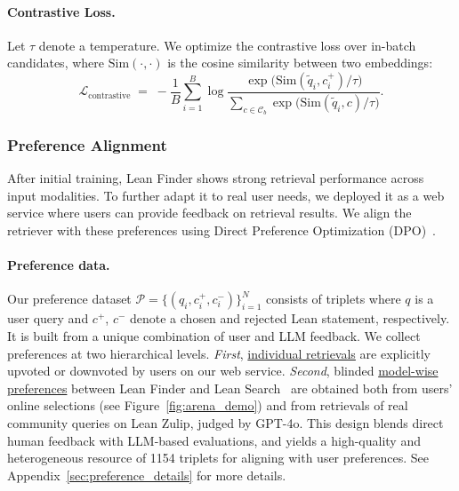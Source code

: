 \documentclass{article} %
\begin{document}
\paragraph{Contrastive Loss.}
Let \(\tau\) denote a temperature. We optimize the contrastive loss over in-batch candidates, 
where \(\mathrm{Sim}(\cdot,\cdot)\) is the cosine similarity between two embeddings:
{\small
\[
\mathcal{L_{\mathrm{contrastive}}}
\;=\;
-\frac{1}{B}\sum_{i=1}^{B}
\log
\frac{\exp\!\big(\mathrm{Sim}(\tilde q_i, c_i^{+})/\tau\big)}
{\displaystyle \sum_{c \in \mathcal{C}_b} \exp\!\big(\mathrm{Sim}(\tilde q_i, c)/\tau\big)}.
\]
}
\subsubsection{Preference Alignment}
\label{sec:rlhf}
After initial training, Lean Finder shows strong retrieval performance across input modalities. To further adapt it to real user needs, we deployed it as a web service where users can provide feedback on retrieval results. We align the retriever with these preferences using Direct Preference Optimization (DPO)~\citep{rafailov2024directpreferenceoptimizationlanguage}.


\paragraph{Preference data.}
Our preference dataset $\mathcal{P}=\{(q_i, c^{+}_i, c^{-}_i)\}_{i=1}^N$ consists of triplets where $q$ is a user query and $c^{+}$, $c^{-}$ denote a chosen and rejected Lean statement, respectively. It is built from a unique combination of user and LLM feedback.
We collect preferences at two hierarchical levels.
\emph{First}, \ul{individual retrievals} are explicitly upvoted or downvoted by users on our web service.
\emph{Second}, blinded \ul{model-wise preferences} between Lean Finder and Lean Search~\citep{gao2024semantic} are obtained both from users' online selections (see Figure~\ref{fig:arena_demo}) and from retrievals of real community queries on Lean Zulip, judged by GPT-4o.
This design blends direct human feedback with LLM-based evaluations,
% 
and yields a high-quality and heterogeneous resource of 1154 triplets for aligning with user preferences.
See Appendix~\ref{sec:preference_details} for more details.
\end{document}
